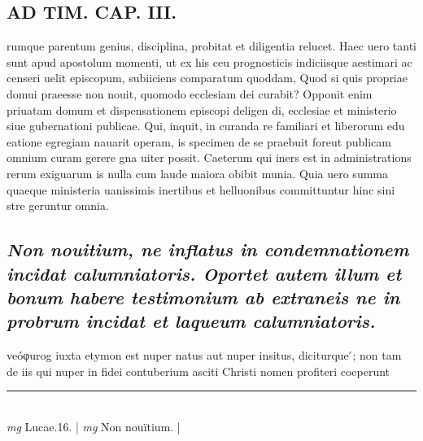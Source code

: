 \documentclass{article}
\begin{document}
\begin{pages}
\section*{AD TIM. CAP. III. }
\marginpar{[ p.129 ]}\pstart rumque parentum genius, disciplina, probitat et diligentia relucet. Haec uero tanti sunt apud apostolum momenti, ut ex his ceu prognosticis indiciisque aestimari ac censeri uelit episcopum, subiiciens comparatum quoddam, Quod si quis propriae domui praeesse non nouit, quomodo ecclesiam dei curabit? Opponit enim priuatam domum et dispensationem episcopi deligen di, ecclesiae et ministerio siue gubernationi publicae. Qui, inquit, in curanda re familiari et liberorum edu eatione egregiam nauarit operam, is specimen de se praebuit foreut publicam omnium curam gerere gna uiter possit. Caeterum qui iners est in administrations rerum exiguarum is nulla cum laude maiora obibit munia. Quia uero summa quaeque ministeria uanissimis inertibus et helluonibus committuntur hinc sini stre geruntur omnia.  \pend
{}
{}
\subsection*{\textit{Non nouitium, ne inflatus in condemnationem incidat calumniatoris. Oportet autem illum et bonum habere testimonium ab extraneis ne in probrum incidat et laqueum calumniatoris. }}\pstart veóφurog iuxta etymon est nuper natus aut nuper insitus, diciturque ́; non tam de iis qui nuper in fidei contuberium asciti Christi nomen profiteri coeperunt  \pend
\vspace{0.5cm}\noindent
\vspace{0.2cm}\rule{1cm}{0.2pt}\\ 
\hspace{0.2cm}\textit{mg}
\footnotesize Lucae.16. 
\normalsize| 
\hspace{0.2cm}\textit{mg}
\footnotesize Non nouïtium. 
\normalsize| 

\end{pages}
\end{document}
